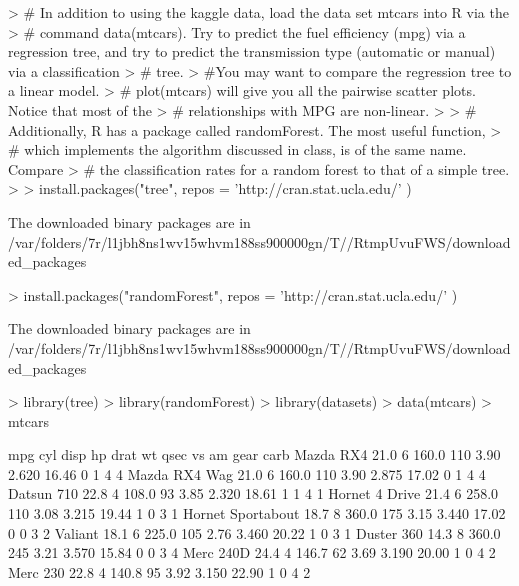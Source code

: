 \documentclass{article}
\begin{document}


\begin{Schunk}
\begin{Sinput}
> # In addition to using the kaggle data, load the data set mtcars into R via the
> # command data(mtcars). Try to predict the fuel efficiency (mpg) via a regression tree, and try to predict the transmission type (automatic or manual) via a classification
> # tree.
> #You may want to compare the regression tree to a linear model.
> # plot(mtcars) will give you all the pairwise scatter plots. Notice that most of the
> # relationships with MPG are non-linear.
> 
> # Additionally, R has a package called randomForest. The most useful function,
> # which implements the algorithm discussed in class, is of the same name. Compare
> # the classification rates for a random forest to that of a simple tree.
> 
> install.packages("tree", repos = 'http://cran.stat.ucla.edu/' )
\end{Sinput}
\begin{Soutput}
The downloaded binary packages are in
	/var/folders/7r/l1jbh8ns1wv15whvm188ss900000gn/T//RtmpUvuFWS/downloaded_packages
\end{Soutput}
\begin{Sinput}
> install.packages("randomForest", repos = 'http://cran.stat.ucla.edu/' )
\end{Sinput}
\begin{Soutput}
The downloaded binary packages are in
	/var/folders/7r/l1jbh8ns1wv15whvm188ss900000gn/T//RtmpUvuFWS/downloaded_packages
\end{Soutput}
\begin{Sinput}
> library(tree)
> library(randomForest)
> library(datasets)
> data(mtcars)
> mtcars
\end{Sinput}
\begin{Soutput}
                     mpg cyl  disp  hp drat    wt  qsec vs am gear carb
Mazda RX4           21.0   6 160.0 110 3.90 2.620 16.46  0  1    4    4
Mazda RX4 Wag       21.0   6 160.0 110 3.90 2.875 17.02  0  1    4    4
Datsun 710          22.8   4 108.0  93 3.85 2.320 18.61  1  1    4    1
Hornet 4 Drive      21.4   6 258.0 110 3.08 3.215 19.44  1  0    3    1
Hornet Sportabout   18.7   8 360.0 175 3.15 3.440 17.02  0  0    3    2
Valiant             18.1   6 225.0 105 2.76 3.460 20.22  1  0    3    1
Duster 360          14.3   8 360.0 245 3.21 3.570 15.84  0  0    3    4
Merc 240D           24.4   4 146.7  62 3.69 3.190 20.00  1  0    4    2
Merc 230            22.8   4 140.8  95 3.92 3.150 22.90  1  0    4    2

\end{Soutput}
\end{Schunk}
\end{document}

